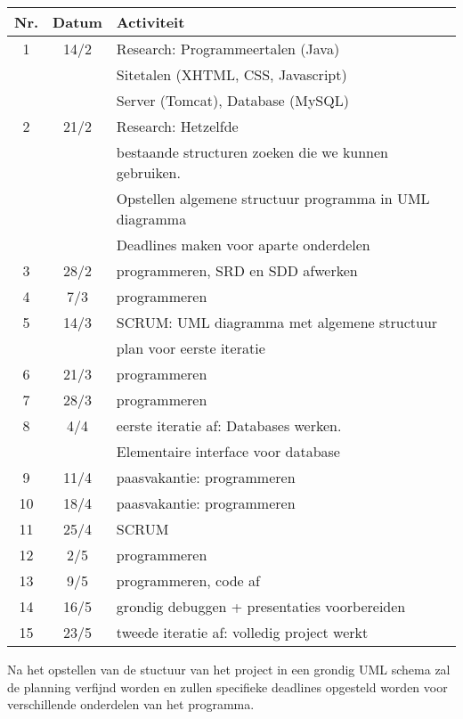 \documentclass{article}
\begin{document}
\begin{center}
\begin{tabular}[t]{|c|c|l|}
\hline
Nr. & Datum & Activiteit  \\
\hline
\hline 
1	& 14/2 &	Research: Programmeertalen (Java) \\
 & & Sitetalen (XHTML, CSS, Javascript) \\ 
 & & Server (Tomcat), Database (MySQL) \\
 \hline
2	& 21/2 &	Research: Hetzelfde \\
 & & bestaande structuren zoeken die we kunnen gebruiken. \\
 & & Opstellen algemene structuur programma in UML diagramma\\
 & & Deadlines maken voor aparte onderdelen \\
 \hline
3	& 28/2 &	programmeren, SRD en SDD afwerken \\
\hline
4	& 7/3 &	programmeren \\
\hline
5	& 14/3 &	SCRUM: UML diagramma met algemene structuur \\
 & & plan voor eerste iteratie \\
 \hline
6	& 21/3 &	programmeren \\
\hline
7	& 28/3 &	programmeren \\
\hline
8	& 4/4 &	eerste iteratie af: Databases werken. \\
 & & Elementaire interface voor database \\
\hline 
9	 & 11/4 &	paasvakantie: programmeren \\
\hline
10 & 18/4 &	paasvakantie: programmeren \\
\hline
11 & 25/4 &	SCRUM \\
\hline
12 & 2/5  &	programmeren\\
\hline
13 &	9/5 &	programmeren, code af \\
\hline
14 &	16/5 &	grondig debuggen + presentaties voorbereiden \\
\hline
15 &	23/5 &	tweede iteratie af: volledig project werkt \\
\hline
\end{tabular}
\end{center}

Na het opstellen van de stuctuur van het project in een grondig UML schema zal de planning verfijnd worden en zullen specifieke deadlines opgesteld worden voor verschillende onderdelen van het programma.


\end{document}
